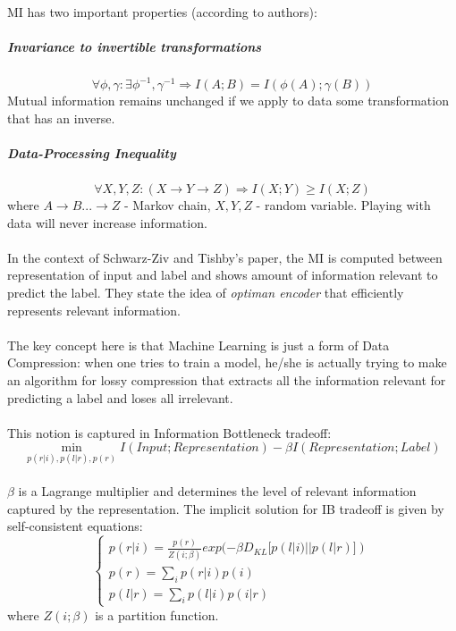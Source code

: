 \documentclass[a4paper,14pt]{extarticle}
\begin{document}
\paragraph{}
MI has two important properties (according to authors):
\subparagraph{Invariance to invertible transformations} 
\begin{equation}
	\forall \phi, \gamma: \exists \phi^{-1}, \gamma^{-1} \Rightarrow I(A;B) = I(\phi(A);\gamma(B))
\end{equation}
Mutual information remains unchanged if we apply to data some transformation that has an inverse.
\subparagraph{Data-Processing Inequality}
\begin{equation}
	\forall X,Y,Z: (X \rightarrow Y \rightarrow Z) \Rightarrow I(X;Y) \geq I(X;Z)
\end{equation}
where $A\rightarrow B ... \rightarrow Z$ - Markov chain, $X,Y,Z$ - random variable.\newline
Playing with data will never increase information.
\paragraph{}
In the context of Schwarz-Ziv and Tishby's paper, the MI is computed between representation of input and label and shows amount of information relevant to predict the label. They state the idea of \textit{optiman encoder} that efficiently represents relevant information.
\paragraph{}
The key concept here is that Machine Learning is just a form of Data Compression: when one tries to train a model, he/she is actually trying to make an algorithm for lossy compression that extracts all the information relevant for predicting a label and loses all irrelevant.
\paragraph{}
This notion is captured in Information Bottleneck tradeoff:
	\begin{equation}
		\min_{p(r|i),p(l|r),p(r)} I(Input;Representation) - \beta I(Representation;Label)
	\end{equation}
\paragraph{}
$\beta$ is a Lagrange multiplier and determines the level of relevant information captured by the representation. The implicit solution for IB tradeoff is given by self-consistent equations:
	\begin{equation}
		\begin{cases}
			p(r|i) = \frac{p(r)}{Z(i;\beta)} exp(-\beta D_{KL}[p(l|i)||p(l|r)]) \\
			p(r) = \sum_{i}p(r|i)p(i) \\
			p(l|r) = \sum_{i}p(l|i)p(i|r)
		\end{cases}
	\end{equation}
where $Z(i;\beta)$ is a partition function.
\end{document}
